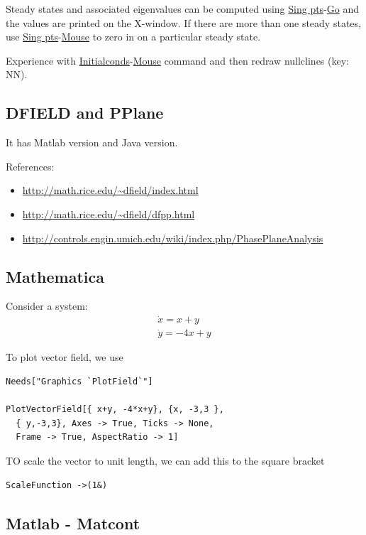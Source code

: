 Steady states and associated eigenvalues can be computed using
\underline{Sing pts}-\underline{Go} and the values are printed on the
X-window. If there are more than one steady states, use
\underline{Sing pts}-\underline{Mouse} to zero in on a particular
steady state. 

Experience with \underline{Initialconds}-\underline{Mouse} command and
then redraw nullclines (key: NN).


\subsection{DFIELD and PPlane}
\label{sec:dfield-pplane}

It has Matlab version and Java version.


References:
\begin{itemize}
\item \url{http://math.rice.edu/~dfield/index.html}
\item \url{http://math.rice.edu/~dfield/dfpp.html}
\item \url{http://controls.engin.umich.edu/wiki/index.php/PhasePlaneAnalysis}
\end{itemize}

\subsection{Mathematica}
\label{sec:mathematica}

Consider a system:
\begin{equation}
  \label{eq:654}
  \begin{split}
    \dot{x} = x + y \\
    \dot{y} = -4x + y
  \end{split}
\end{equation}

To plot vector field, we use
\begin{lstlisting}
Needs["Graphics `PlotField`"]

PlotVectorField[{ x+y, -4*x+y}, {x, -3,3 }, 
  { y,-3,3}, Axes -> True, Ticks -> None, 
  Frame -> True, AspectRatio -> 1] 
\end{lstlisting}
TO scale the vector to unit length, we can add this to the square
bracket
\begin{verbatim}
ScaleFunction ->(1&) 
\end{verbatim}

\subsection{Matlab - Matcont}
\label{sec:matlab}

